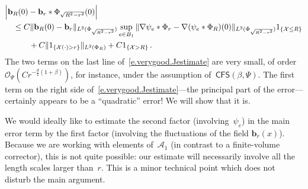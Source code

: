 \documentclass[11pt]{article} %
\numberwithin{equation}{section}
\theoremstyle{definition}
\newcommand*{\R}{\ensuremath{\mathbb{R}}}
\renewcommand{\b}{\ensuremath{\mathbf{b}}}
\renewcommand{\a}{\mathbf{a}}
\newcommand{\ahom}{\bar{\a}}
\newcommand{\X}{\mathcal{X}}
\renewcommand{\O}{\mathcal{O}}
\newcommand{\indc}{1}
\newcommand{\minscale}{\chi}
\newcommand{\CFS}{\mathsf{CFS}}
\newcommand{\A}{\mathcal{A}}
\begin{document}
\begin{align}
\lefteqn{
\Bigl| 
 \b_R(0) - \b_r \ast \Phi_{\sqrt{R^2-r^2}} (0)
\Bigr|
} \quad & 
\notag \\ &
\leq
C \| \b_R(0)- \b_r\|_{L^2(\Phi_{\sqrt{R^2-r^2}})} 
\sup_{e \in B_1} 
\|  \nabla \psi_e \ast \Phi_{r}- \nabla (\psi_e \ast\Phi_R)(0) \|_{L^2(\Phi_{\sqrt{R^2-r^2}})} 
\indc_{\{\X \leq R \}}
\notag 
\\ & \qquad
+
C  \|   \indc_{\{\X(\cdot)>r\}} \|_{L^2(\Phi_{R})}  + C \indc_{\{\X > R \}}
\,.
\label{e.verygood.Jestimate}
\end{align}
The two terms on the last line of~\eqref{e.verygood.Jestimate} are very small, of order $\O_\Psi(C r^{-\frac d2(1+\beta)})$, for instance, under the assumption of~$\CFS(\beta,\Psi)$. The first term on the right side of~\eqref{e.verygood.Jestimate}---the principal part of the error---certainly appears to be a ``quadratic'' error! We will show that it is. 


\smallskip

We would ideally like to estimate the second factor (involving~$\psi_e$) in the main error term by the first factor (involving the fluctuations of the field $\b_r(x)$). Because we are working with elements of~$\A_1$ (in contrast to a finite-volume corrector), this is not quite possible: our estimate will necessarily involve all the length scales larger than~$r$. This is a minor technical point which does not disturb the main argument.
\end{document}
